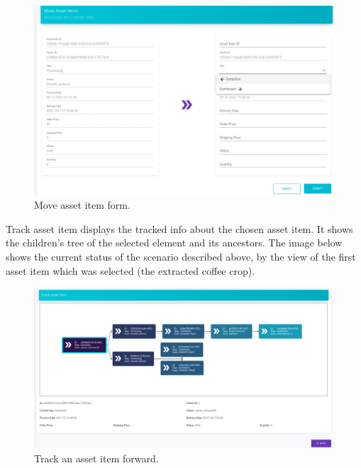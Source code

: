 \begin{figure}[H]
\begin{center}
  \includegraphics[scale=0.32]{images/use_example/091_move_asset_Item.png}
\caption{Move asset item form.}
\label{fig:move_asset_item}
\end{center}
\end{figure}

Track asset item displays the tracked info about the chosen asset item. It shows the children's tree of the selected element and its ancestors. The image below shows the current status of the scenario described above, by the view of the first asset item which was selected (the extracted coffee crop).

\begin{figure}[H]
\begin{center}
  \includegraphics[scale=0.275]{images/use_example/092_track_asset_Item.png}
\caption{Track an asset item forward.}
\label{fig:track_asset_item}
\end{center}
\end{figure}

